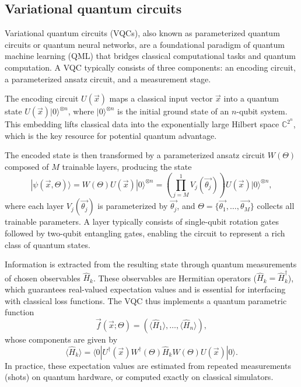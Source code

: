 \subsection{Variational quantum circuits}
Variational quantum circuits (VQCs), also known as parameterized quantum circuits or quantum neural networks, are a foundational paradigm of quantum machine learning (QML) that bridges classical computational tasks and quantum computation. A VQC typically consists of three components: an encoding circuit, a parameterized ansatz circuit, and a measurement stage.

The encoding circuit $U(\overrightarrow{x})$ maps a classical input vector $\overrightarrow{x}$ into a quantum state $U(\overrightarrow{x})|0\rangle^{\otimes n}$, where $|0\rangle^{\otimes n}$ is the initial ground state of an $n$-qubit system. This embedding lifts classical data into the exponentially large Hilbert space $\mathbb{C}^{2^n}$, which is the key resource for potential quantum advantage.

The encoded state is then transformed by a parameterized ansatz circuit $W(\Theta)$ composed of $M$ trainable layers, producing the state
\begin{equation}
    |\psi(\overrightarrow{x}, \Theta)\rangle = W(\Theta)U(\overrightarrow{x})|0\rangle^{\otimes n} = \left(\prod_{j=M}^{1} V_j(\overrightarrow{\theta_j})\right)U(\overrightarrow{x})|0\rangle^{\otimes n},
\label{QuantumState}
\end{equation}
where each layer $V_j(\overrightarrow{\theta_j})$ is parameterized by $\overrightarrow{\theta_j}$, and $\Theta=\{\overrightarrow{\theta_1}, \ldots, \overrightarrow{\theta_M}\}$ collects all trainable parameters. A layer typically consists of single-qubit rotation gates followed by two-qubit entangling gates, enabling the circuit to represent a rich class of quantum states.

Information is extracted from the resulting state through quantum measurements of chosen observables $\hat{H}_k$. These observables are Hermitian operators ($\hat{H}_k=\hat{H}_k^\dagger$), which guarantees real-valued expectation values and is essential for interfacing with classical loss functions. The VQC thus implements a quantum parametric function
\begin{equation}
\overrightarrow{f}(\overrightarrow{x}; \Theta) = \left(\langle \hat{H}_1 \rangle, \ldots, \langle \hat{H}_n \rangle\right),
\end{equation}
whose components are given by
\begin{equation}
\langle \hat{H}_k \rangle = \langle 0|U^{\dagger}(\overrightarrow{x})W^{\dagger}(\Theta)\hat{H}_k W(\Theta)U(\overrightarrow{x})|0\rangle.
\end{equation}
In practice, these expectation values are estimated from repeated measurements (shots) on quantum hardware, or computed exactly on classical simulators.

